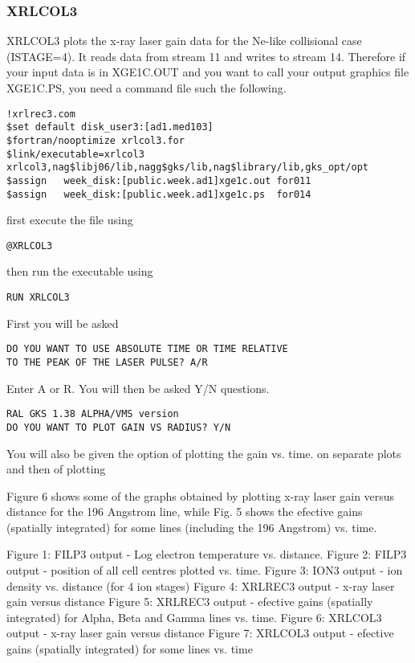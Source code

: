 \subsubsection{XRLCOL3}
XRLCOL3 plots the x-ray laser gain data for the Ne-like collisional case (ISTAGE=4). It reads data from stream 11
and writes to stream 14.
Therefore if your input data is in
XGE1C.OUT
and you want to call your output graphics file XGE1C.PS,
you need a command file such the following.
\begin{verbatim}
!xrlrec3.com
$set default disk_user3:[ad1.med103]
$fortran/nooptimize xrlcol3.for
$link/executable=xrlcol3 xrlcol3,nag$libj06/lib,nagg$gks/lib,nag$library/lib,gks_opt/opt
$assign   week_disk:[public.week.ad1]xge1c.out for011
$assign   week_disk:[public.week.ad1]xge1c.ps  for014
\end{verbatim}
first execute the file using
\begin{verbatim}
@XRLCOL3
\end{verbatim}
then run the executable using
\begin{verbatim}
RUN XRLCOL3
\end{verbatim}
First you will be asked
\begin{verbatim}
DO YOU WANT TO USE ABSOLUTE TIME OR TIME RELATIVE
TO THE PEAK OF THE LASER PULSE? A/R
\end{verbatim}
Enter A or R. You will then be asked Y/N questions.
\begin{verbatim}
RAL GKS 1.38 ALPHA/VMS version
DO YOU WANT TO PLOT GAIN VS RADIUS? Y/N
\end{verbatim}

You will also be given the option of plotting the  gain vs. time.
on separate plots  and then of plotting
 
Figure 6 shows some of the graphs obtained by plotting x-ray laser gain versus distance for the 196 Angstrom 
line, while  Fig. 5 shows
the efective gains (spatially integrated) for some lines (including the 196 Angstrom) vs. time.
 
\newpage
\vspace*{9.15in}
Figure 1: FILP3 output - 
Log electron temperature vs. distance.
\newpage
\vspace*{9.15in}
Figure 2: FILP3 output -
position of all cell centres plotted vs. time.
\newpage
\vspace*{9.15in}
Figure 3: ION3 output -
ion density vs. distance (for 4 ion stages)
\newpage
\vspace*{9.15in}
Figure 4: XRLREC3 output -
x-ray laser gain versus distance
\newpage
\vspace*{9.15in}
Figure 5: XRLREC3 output -
efective gains (spatially integrated) for Alpha, Beta and Gamma lines vs. time.
\newpage
\vspace*{9.15in}
Figure 6: XRLCOL3 output -
x-ray laser gain versus distance 
\newpage
\vspace*{9.15in}
Figure 7: XRLCOL3 output -
efective gains (spatially integrated) for some lines vs. time


